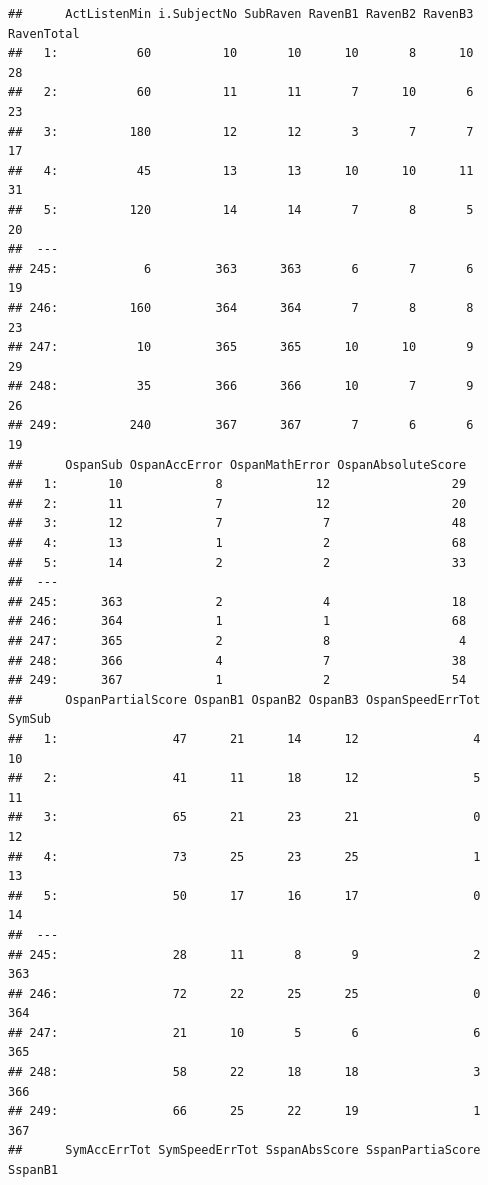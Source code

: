 \documentclass[]{book}
\theoremstyle{definition}
\theoremstyle{definition}
\theoremstyle{definition}
\theoremstyle{remark}
\begin{document}
\begin{verbatim}
##      ActListenMin i.SubjectNo SubRaven RavenB1 RavenB2 RavenB3 RavenTotal
##   1:           60          10       10      10       8      10         28
##   2:           60          11       11       7      10       6         23
##   3:          180          12       12       3       7       7         17
##   4:           45          13       13      10      10      11         31
##   5:          120          14       14       7       8       5         20
##  ---                                                                     
## 245:            6         363      363       6       7       6         19
## 246:          160         364      364       7       8       8         23
## 247:           10         365      365      10      10       9         29
## 248:           35         366      366      10       7       9         26
## 249:          240         367      367       7       6       6         19
##      OspanSub OspanAccError OspanMathError OspanAbsoluteScore
##   1:       10             8             12                 29
##   2:       11             7             12                 20
##   3:       12             7              7                 48
##   4:       13             1              2                 68
##   5:       14             2              2                 33
##  ---                                                         
## 245:      363             2              4                 18
## 246:      364             1              1                 68
## 247:      365             2              8                  4
## 248:      366             4              7                 38
## 249:      367             1              2                 54
##      OspanPartialScore OspanB1 OspanB2 OspanB3 OspanSpeedErrTot SymSub
##   1:                47      21      14      12                4     10
##   2:                41      11      18      12                5     11
##   3:                65      21      23      21                0     12
##   4:                73      25      23      25                1     13
##   5:                50      17      16      17                0     14
##  ---                                                                  
## 245:                28      11       8       9                2    363
## 246:                72      22      25      25                0    364
## 247:                21      10       5       6                6    365
## 248:                58      22      18      18                3    366
## 249:                66      25      22      19                1    367
##      SymAccErrTot SymSpeedErrTot SspanAbsScore SspanPartiaScore SspanB1

\end{verbatim}
\end{document}

